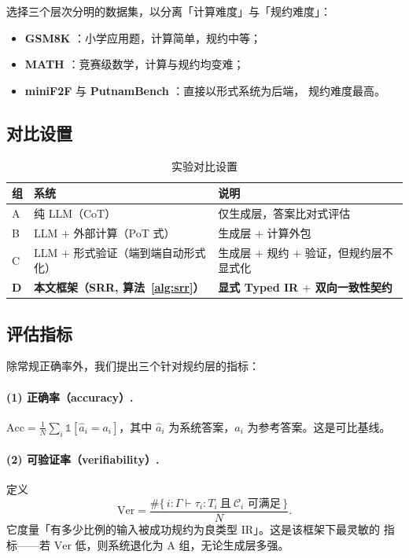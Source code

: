 \documentclass[UTF8,a4paper,11pt]{ctexart}
\begin{document}
选择三个层次分明的数据集，以分离「计算难度」与「规约难度」：
\begin{itemize}[leftmargin=1.6em,itemsep=2pt]
  \item \textbf{GSM8K} \citep{cobbe2021gsm8k}：小学应用题，计算简单，规约中等；
  \item \textbf{MATH} \citep{hendrycks2021math}：竞赛级数学，计算与规约均变难；
  \item \textbf{miniF2F} \citep{zheng2022minif2f} 与 \textbf{PutnamBench}
        \citep{tsoukalas2024putnambench}：直接以形式系统为后端，
        规约难度最高。
\end{itemize}

\subsection{对比设置}

\begin{table}[htbp]
\centering
\caption{实验对比设置}
\label{tab:setup}
\small
\begin{tabular}{@{}p{1.0cm}p{4.6cm}p{7.6cm}@{}}
\toprule
\textbf{组} & \textbf{系统} & \textbf{说明} \\
\midrule
A & 纯 LLM（CoT）& 仅生成层，答案比对式评估 \\
B & LLM $+$ 外部计算（PoT 式） & 生成层 $+$ 计算外包 \\
C & LLM $+$ 形式验证（端到端自动形式化） & 生成层 $+$ 规约 $+$ 验证，但规约层不显式化 \\
\addlinespace
\textbf{D} & \textbf{本文框架（SRR, 算法~\ref{alg:srr}）} & \textbf{显式 Typed IR $+$ 双向一致性契约} \\
\bottomrule
\end{tabular}
\end{table}

\subsection{评估指标}

除常规正确率外，我们提出三个针对规约层的指标：

\paragraph{(1) 正确率（accuracy）.}
$\mathrm{Acc} = \frac{1}{N}\sum_i \mathbb{1}[\hat{a}_i = a_i]$，其中
$\hat{a}_i$ 为系统答案，$a_i$ 为参考答案。这是可比基线。

\paragraph{(2) 可验证率（verifiability）.}
定义
\begin{equation}\label{eq:verifiability}
  \mathrm{Ver} = \frac{\#\{\, i : \Gamma \vdash \tau_i : T_i \ \text{且}\ \mathcal{C}_i \text{ 可满足} \,\}}{N}.
\end{equation}
它度量「有多少比例的输入被成功规约为良类型 IR」。这是该框架下最灵敏的
指标——若 $\mathrm{Ver}$ 低，则系统退化为 A 组，无论生成层多强。
\end{document}
